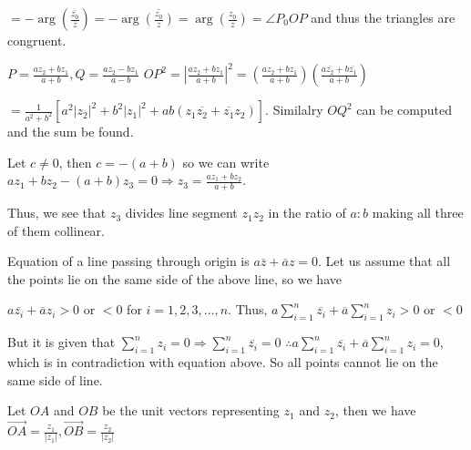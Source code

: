   $= -\arg\left(\frac{\overline{z_0}}{\overline{z}}\right)= -\arg\overline{\left(\frac{z_0}{z}\right)} =
  \arg\left(\frac{z_0}{z}\right) = \angle P_0OP$ and thus the triangles are congruent.
\item $P = \frac{az_2 + bz_1}{a + b}, Q = \frac{az_2 - bz_1}{a - b}$
  $OP^2 = \left|\frac{az_2 + bz_1}{a + b}\right|^2 = \left(\frac{az_2 + bz_1}{a +
  b}\right)\left(\frac{a\overline{z_2} + b\overline{z_1}}{a + b}\right)$

  $= \frac{1}{a^2 + b^2}[a^2|z_2|^2 + b^2|z_1|^2 + ab(z_1\overline{z_2} + \overline{z_1}z_2)]$.
  Similalry $OQ^2$ can be computed and the sum be found.
\item Let $c\neq 0$, then $c = -(a + b)$ so we can write $az_1 + bz_2 - (a + b)z_3 = 0 \Rightarrow z_3 =
  \frac{az_1 + bz_2}{a + b}$.

  Thus, we see that $z_3$ divides line segment $z_1z_2$ in the ratio of $a:b$ making all three of them
  collinear.
\item Equation of a line passing through origin is $a\overline{z} + \overline{a}z = 0$. Let us assume that
  all the points lie on the same side of the above line, so we have

  $a\overline{z_i} + \overline{a}z_i > 0$ or $< 0$ for $i = 1, 2, 3, \ldots, n$.
  Thus, $a\displaystyle\sum_{i = 1}^n\overline{z_i} + \overline{a}\sum_{i = 1}^nz_i > 0$ or $< 0$

  But it is given that $\displaystyle\sum_{i = 1}^n z_i = 0 \Rightarrow \sum_{i = 1}^n \overline{z_i} = 0$
  $\therefore\displaystyle a\sum_{i =1}^n\overline{z_i} + \overline{a}\sum_{i = 1}^nz_i = 0$,
  which is in contradiction with equation above. So all points cannot lie on the same side of line.
\item Let $OA$ and $OB$ be the unit vectors representing $z_1$ and $z_2$, then we have
  $\vec{OA} = \frac{z_1}{|z_1|}, \vec{OB} = \frac{z_2}{|z_2|}$

